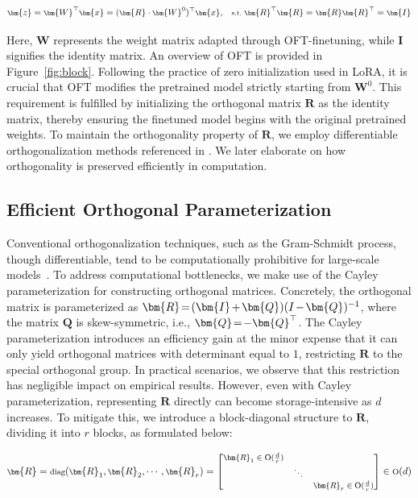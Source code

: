 \begin{equation}\label{eq:oft_general}
    \footnotesize
    \bm{z}=\bm{W}^\top\bm{x}=(\bm{R}\cdot\bm{W}^0)^\top\bm{x},~~~\text{s.t.}~\bm{R}^\top\bm{R}=\bm{R}\bm{R}^\top=\bm{I}
\end{equation}

Here, $\bm{W}$ represents the weight matrix adapted through OFT-finetuning, while $\bm{I}$ signifies the identity matrix. An overview of OFT is provided in Figure~\ref{fig:block}. Following the practice of zero initialization used in LoRA, it is crucial that OFT modifies the pretrained model strictly starting from $\bm{W}^0$. This requirement is fulfilled by initializing the orthogonal matrix $\bm{R}$ as the identity matrix, thereby ensuring the finetuned model begins with the original pretrained weights. To maintain the orthogonality property of $\bm{R}$, we employ differentiable orthogonalization methods referenced in \cite{liu2021orthogonal,lezcano2019cheap}. We later elaborate on how orthogonality is preserved efficiently in computation.

\subsection{Efficient Orthogonal Parameterization}\label{sect:eff_ortho}

Conventional orthogonalization techniques, such as the Gram-Schmidt process, though differentiable, tend to be computationally prohibitive for large-scale models~\cite{liu2021orthogonal}. To address computational bottlenecks, we make use of the Cayley parameterization for constructing orthogonal matrices. Concretely, the orthogonal matrix is parameterized as $\thickmuskip=2mu \medmuskip=2mu \bm{R}=(\bm{I}+\bm{Q})(I-\bm{Q})^{-1}$, where the matrix $\bm{Q}$ is skew-symmetric, i.e., $\thickmuskip=2mu \medmuskip=2mu \bm{Q}=-\bm{Q}^\top$. The Cayley parameterization introduces an efficiency gain at the minor expense that it can only yield orthogonal matrices with determinant equal to $1$, restricting $\bm{R}$ to the special orthogonal group. In practical scenarios, we observe that this restriction has negligible impact on empirical results. However, even with Cayley parameterization, representing $\bm{R}$ directly can become storage-intensive as $d$ increases. To mitigate this, we introduce a block-diagonal structure to $\bm{R}$, dividing it into $r$ blocks, as formulated below:

\begin{equation}
    \footnotesize
    \bm{R}=\text{diag}(\bm{R}_1,\bm{R}_2,\cdots,\bm{R}_r)=\begin{bmatrix}
    \bm{R}_1\in \text{O}(\frac{d}{r}) &  &\\
    &\ddots & \\
    & & \bm{R}_r\in \text{O}(\frac{d}{r})
    \end{bmatrix}\in \text{O}(d)
\end{equation}

